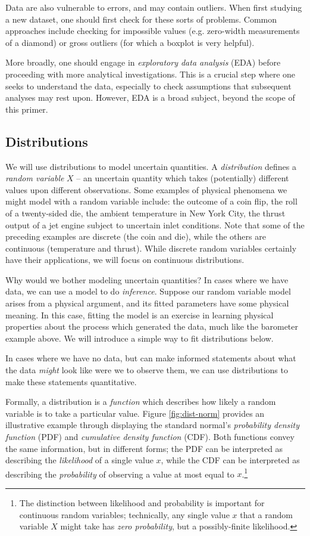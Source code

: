\documentclass[../primer.tex]{subfiles}
\begin{document}
Data are also vulnerable to errors, and may contain outliers. When first
studying a new dataset, one should first check for these sorts of problems.
Common approaches include checking for impossible values (e.g. zero-width
measurements of a diamond) or gross outliers (for which a boxplot is very
helpful).

More broadly, one should engage in \emph{exploratory data analysis} (EDA) before
proceeding with more analytical investigations.\cite{tukey1977eda} This is a
crucial step where one seeks to understand the data, especially to check
assumptions that subsequent analyses may rest upon. However, EDA is a broad
subject, beyond the scope of this primer.

\subsection{Distributions}
We will use distributions to model uncertain quantities. A \emph{distribution}
defines a \emph{random variable} $X$ -- an uncertain quantity which takes
(potentially) different values upon different observations. Some examples of
physical phenomena we might model with a random variable include: the outcome of
a coin flip, the roll of a twenty-sided die, the ambient temperature in New York
City, the thrust output of a jet engine subject to uncertain inlet conditions.
Note that some of the preceding examples are discrete (the coin and die), while
the others are continuous (temperature and thrust). While discrete random
variables certainly have their applications, we will focus on continuous
distributions.

Why would we bother modeling uncertain quantities? In cases where we have data,
we can use a model to do \emph{inference}. Suppose our random variable model
arises from a physical argument, and its fitted parameters have some physical
meaning. In this case, fitting the model is an exercise in learning physical
properties about the process which generated the data, much like the barometer
example above. We will introduce a simple way to fit distributions below.

In cases where we have no data, but can make informed statements about what the
data \emph{might} look like were we to observe them, we can use distributions to
make these statements quantitative.

Formally, a distribution is a \emph{function} which describes how likely a
random variable is to take a particular value. Figure \ref{fig:dist-norm}
provides an illustrative example through displaying the standard normal's
\emph{probability density function} (PDF) and \emph{cumulative density function}
(CDF). Both functions convey the same information, but in different forms; the
PDF can be interpreted as describing the \emph{likelihood} of a single value
$x$, while the CDF can be interpreted as describing the \emph{probability} of
observing a value at most equal to $x$.\footnote{The distinction between
  likelihood and probability is important for continuous random variables;
  technically, any single value $x$ that a random variable $X$ might take has
  \emph{zero probability}, but a possibly-finite likelihood.}
\end{document}

